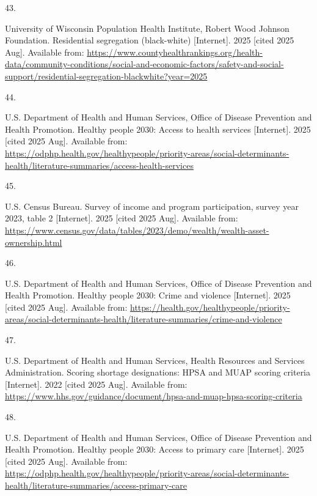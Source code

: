 \documentclass[
  english,
  letterpaper,
]{report}
\newlength{\cslhangindent}
\newlength{\csllabelwidth}
\newenvironment{CSLReferences}[2] %
 {\begin{list}{}{%
  \setlength{\itemindent}{0pt}
  \setlength{\leftmargin}{0pt}
  \setlength{\parsep}{0pt}
  \ifodd #1
   \setlength{\leftmargin}{\cslhangindent}
   \setlength{\itemindent}{-1\cslhangindent}
  \fi
  \setlength{\itemsep}{#2\baselineskip}}}
 {\end{list}}
\newcommand{\CSLLeftMargin}[1]{\parbox[t]{\csllabelwidth}{\strut#1\strut}}
\newcommand{\CSLRightInline}[1]{\parbox[t]{\linewidth - \csllabelwidth}{\strut#1\strut}}
\begin{document}
\begin{CSLReferences}{0}{1}
\CSLLeftMargin{43. }%
\CSLRightInline{University of Wisconsin Population Health Institute,
Robert Wood Johnson Foundation. Residential segregation (black-white)
{[}Internet{]}. 2025 {[}cited 2025 Aug{]}. Available from:
\url{https://www.countyhealthrankings.org/health-data/community-conditions/social-and-economic-factors/safety-and-social-support/residential-segregation-blackwhite?year=2025}}

\CSLLeftMargin{44. }%
\CSLRightInline{U.S. Department of Health and Human Services, Office of
Disease Prevention and Health Promotion. Healthy people 2030: Access to
health services {[}Internet{]}. 2025 {[}cited 2025 Aug{]}. Available
from:
\url{https://odphp.health.gov/healthypeople/priority-areas/social-determinants-health/literature-summaries/access-health-services}}

\CSLLeftMargin{45. }%
\CSLRightInline{U.S. Census Bureau. Survey of income and program
participation, survey year 2023, table 2 {[}Internet{]}. 2025 {[}cited
2025 Aug{]}. Available from:
\url{https://www.census.gov/data/tables/2023/demo/wealth/wealth-asset-ownership.html}}

\CSLLeftMargin{46. }%
\CSLRightInline{U.S. Department of Health and Human Services, Office of
Disease Prevention and Health Promotion. Healthy people 2030: Crime and
violence {[}Internet{]}. 2025 {[}cited 2025 Aug{]}. Available from:
\url{https://health.gov/healthypeople/priority-areas/social-determinants-health/literature-summaries/crime-and-violence}}

\CSLLeftMargin{47. }%
\CSLRightInline{U.S. Department of Health and Human Services, Health
Resources and Services Administration. Scoring shortage designations:
HPSA and MUAP scoring criteria {[}Internet{]}. 2022 {[}cited 2025
Aug{]}. Available from:
\url{https://www.hhs.gov/guidance/document/hpsa-and-muap-hpsa-scoring-criteria}}

\CSLLeftMargin{48. }%
\CSLRightInline{U.S. Department of Health and Human Services, Office of
Disease Prevention and Health Promotion. Healthy people 2030: Access to
primary care {[}Internet{]}. 2025 {[}cited 2025 Aug{]}. Available from:
\url{https://odphp.health.gov/healthypeople/priority-areas/social-determinants-health/literature-summaries/access-primary-care}}


\end{CSLReferences}
\end{document}
